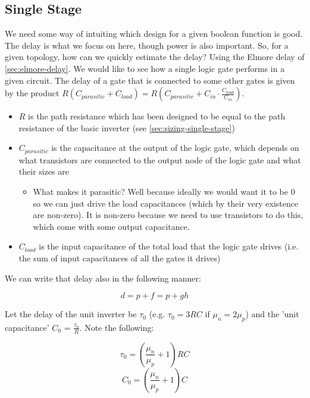 \documentclass[11pt]{report}
\begin{document}
\subsection{Single Stage}
We need some way of intuiting which design for a given boolean function is good. The delay is what we focus on here, though power is also important. So, for a given topology, how can we quickly estimate the delay? Using the Elmore delay of \autoref{sec:elmore-delay}. We would like to see how a single logic gate performs in a given circuit. The delay of a gate that is connected to some other gates is given by the product $R(C_{parasitic} + C_{load}) = R(C_{parasitic} + C_{in}\cdot\frac{C_{load}}{C_{in}})$.
\begin{itemize}
\item $R$ is the path resistance which has been designed to be equal to the path resistance of the basic inverter (see \autoref{sec:sizing-single-stage})
\item $C_{parasitic}$ is the capacitance at the output of the logic gate, which depends on what transistors are connected to the output node of the logic gate and what their sizes are\
\begin{itemize}
	\item What makes it parasitic? Well because ideally we would want it to be 0 so we can just drive the load capacitances (which by their very existence are non-zero). It is non-zero because we need to use transistors to do this, which come with some output capacitance.
\end{itemize}
\item $C_{load}$ is the input capacitance of the total load that the logic gate drives (i.e. the sum of input capacitances of all the gates it drives)

\end{itemize}
We can write that delay also in the following manner:

\begin{equation}
\label{eqn:logic-effort-delay}
	d = p + f = p + gh
\end{equation}

Let the delay of the unit inverter be $\tau_0$ (e.g. $\tau_0 = 3RC$ if $\mu_n = 2\mu_p$) and the 'unit capacitance' $C_0$ = $\frac{\tau_0}{R}$. Note the following:

\begin{equation}
	\tau_0 = \left(\frac{\mu_n}{\mu_p} + 1\right)RC
\end{equation}
\begin{equation}
	C_0 = \left(\frac{\mu_n}{\mu_p} + 1\right)C
\end{equation}
\end{document}
